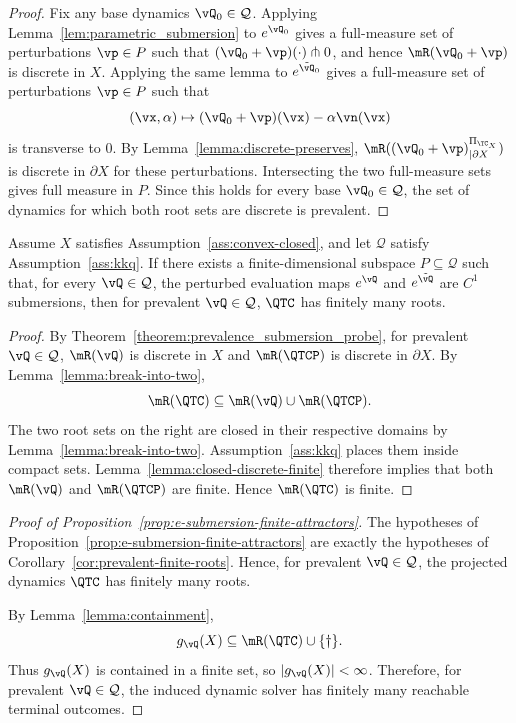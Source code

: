 \begin{proof}
Fix any base dynamics $\vQ_0\in\mathcal Q$. Applying
Lemma~\ref{lem:parametric_submersion} to $e^{\vQ_0}$ gives a full-measure set of
perturbations $\vp\in P$ such that $(\vQ_0+\vp)(\cdot)\pitchfork 0$, and hence
$\mR(\vQ_0+\vp)$ is discrete in $X$. Applying the same lemma to
$e^{\tilde{\vQ}_0}$ gives a full-measure set of perturbations $\vp\in P$ such
that
\[
(\vx,\alpha)\mapsto(\vQ_0+\vp)(\vx)-\alpha\vn(\vx)
\]
is transverse to $0$. By Lemma~\ref{lemma:discrete-preserves},
$\mR((\vQ_0+\vp)^{\Pi_{\TC_X}}_{|\partial X})$ is discrete in $\partial X$ for
these perturbations. Intersecting the two full-measure sets gives full measure
in $P$. Since this holds for every base $\vQ_0\in\mathcal Q$, the set of
dynamics for which both root sets are discrete is prevalent.
\end{proof}

\begin{corollary}\label{cor:prevalent-finite-roots}
Assume $X$ satisfies Assumption~\ref{ass:convex-closed}, and let $\mathcal Q$
satisfy Assumption~\ref{ass:kkq}. If there exists a finite-dimensional subspace
$P\subseteq\mathcal Q$ such that, for every $\vQ\in\mathcal Q$, the perturbed
evaluation maps $e^{\vQ}$ and $e^{\tilde{\vQ}}$ are $C^1$ submersions, then for
prevalent $\vQ\in\mathcal Q$, $\QTC$ has finitely many roots.
\end{corollary}
\begin{proof}
By Theorem~\ref{theorem:prevalence_submersion_probe}, for prevalent
$\vQ\in\mathcal Q$, $\mR(\vQ)$ is discrete in $X$ and $\mR(\QTCP)$ is discrete
in $\partial X$. By Lemma~\ref{lemma:break-into-two},
\[
\mR(\QTC)\subseteq \mR(\vQ)\cup \mR(\QTCP).
\]
The two root sets on the right are closed in their respective domains by
Lemma~\ref{lemma:break-into-two}. Assumption~\ref{ass:kkq} places them inside
compact sets. Lemma~\ref{lemma:closed-discrete-finite} therefore implies that
both $\mR(\vQ)$ and $\mR(\QTCP)$ are finite. Hence $\mR(\QTC)$ is finite.
\end{proof}

\label{proof:e-submersion-finite-attractors}
\propESubmersionFiniteAttractors*
\begin{proof}[Proof of Proposition~\ref{prop:e-submersion-finite-attractors}]
The hypotheses of Proposition~\ref{prop:e-submersion-finite-attractors} are
exactly the hypotheses of Corollary~\ref{cor:prevalent-finite-roots}. Hence,
for prevalent $\vQ\in\mathcal Q$, the projected dynamics $\QTC$ has finitely
many roots.

By Lemma~\ref{lemma:containment},
\[
g_{\vQ}(X)\subseteq \mR(\QTC)\cup\{\dagger\}.
\]
Thus $g_{\vQ}(X)$ is contained in a finite set, so $|g_{\vQ}(X)|<\infty$.
Therefore, for prevalent $\vQ\in\mathcal Q$, the induced dynamic solver has
finitely many reachable terminal outcomes.
\end{proof}

